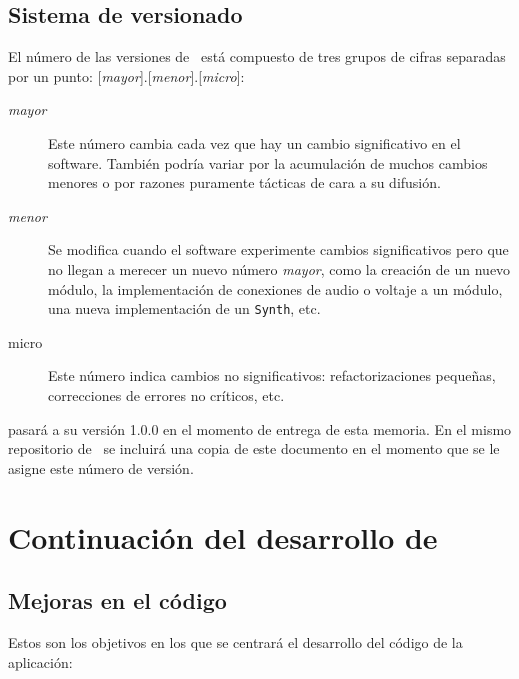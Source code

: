\subsection{Sistema de versionado}

El número de las versiones de \appName~está compuesto de tres grupos de cifras separadas por un punto: [\textit{mayor}].[\textit{menor}].[\textit{micro}]:

\begin{description} 
	\item[\textit{mayor}] Este número cambia cada vez que hay un cambio significativo en el software.  También podría variar por la acumulación de muchos cambios menores o por razones puramente tácticas de cara a su difusión.
	\item[\textit{menor}] Se modifica cuando el software experimente cambios significativos pero que no llegan a merecer un nuevo número \textit{mayor}, como la creación de un nuevo módulo, la implementación de conexiones de audio o voltaje a un módulo, una nueva implementación de un \texttt{Synth}, etc.
	\item[micro] Este número indica cambios no significativos: refactorizaciones pequeñas, correcciones de errores no críticos, etc.
\end{description}

\appName pasará a su versión 1.0.0 en el momento de entrega de esta memoria. En el mismo repositorio de \appName~se incluirá una copia de este documento en el momento que se le asigne este número de versión.


\section[Continuación del desarrollo]{Continuación del desarrollo de \appName {}}


\subsection{Mejoras en el código}
Estos son los objetivos en los que se centrará el desarrollo del código de la aplicación:

